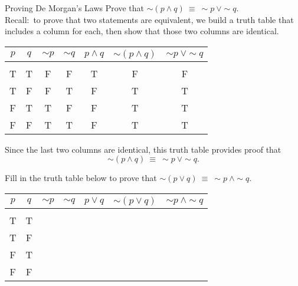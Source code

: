 \begin{example}[https://www.youtube.com/watch?v=FvBhN-V3nRg]{Proving De Morgan's Laws}
Prove that $\sim (p \wedge q)\ \equiv\ \sim p\ \vee \sim q$.\\

Recall:\sol\ to prove that two statements are equivalent, we build a truth table that includes a column for each, then show that those two columns are identical.
\begin{center}
\begin{tabular}{|c c c c c c c|}
\hline
$p$ & $q$ & $\sim p$ & $\sim q$ & $p \wedge q$ & $\sim (p \wedge q)$ & $\sim p\ \vee \sim q$\\
\hline
& & & & & & \\
T & T & F & F & T & F & F\\
T & F & F & T & F & T & T\\
F & T & T & F & F & T & T\\
F & F & T & T & F & T & T\\
\hline
\end{tabular}
\end{center}

Since the last two columns are identical, this truth table provides proof that \[\sim (p \wedge q)\ \equiv\ \sim p\ \vee \sim q.\]
\end{example}

\begin{try}
Fill in the truth table below to prove that $\sim (p \vee q)\ \equiv\ \sim p\ \wedge \sim q$.
\begin{center}
\begin{tabular}{|c c c c c c c|}
\hline
$p$ & $q$ & $\sim p$ & $\sim q$ & $p \vee q$ & $\sim (p \vee q)$ & $\sim p\ \wedge \sim q$\\
\hline
& & & & & & \\
T & T & & & & & \\
T & F & & & & & \\
F & T & & & & & \\
F & F & & & & & \\
\hline
\end{tabular}
\end{center}
\end{try}
\vfill
\pagebreak

